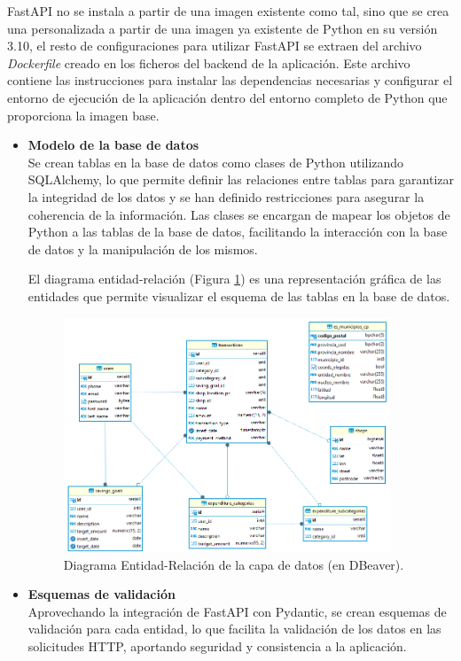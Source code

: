 FastAPI no se instala a partir de una imagen existente como tal, sino que se crea una personalizada a partir de una imagen ya existente de Python en su versión 3.10, el resto de configuraciones para utilizar FastAPI se extraen del archivo \textit{Dockerfile} creado en los ficheros del backend de la aplicación. Este archivo contiene las instrucciones para instalar las dependencias necesarias y configurar el entorno de ejecución de la aplicación dentro del entorno completo de Python que proporciona la imagen base. 

\begin{itemize}
    \item \textbf{Modelo de la base de datos}\\
        Se crean tablas en la base de datos como clases de Python utilizando SQLAlchemy, lo que permite definir las relaciones entre tablas para garantizar la integridad de los datos y se han definido restricciones para asegurar la coherencia de la información. Las clases se encargan de mapear los objetos de Python a las tablas de la base de datos, facilitando la interacción con la base de datos y la manipulación de los mismos.

El diagrama entidad-relación (Figura \ref{fig:diagrama_ER}) es una representación gráfica de las entidades que permite visualizar el esquema de las tablas en la base de datos.

\begin{figure}[ht!]
    \centering
    \includegraphics[height=70mm]{imagenes/diagrama_ER.png}
    \caption{Diagrama Entidad-Relación de la capa de datos (en DBeaver).}
    \label{fig:diagrama_ER}
\end{figure}


    \item \textbf{Esquemas de validación}\\
        Aprovechando la integración de FastAPI con Pydantic, se crean esquemas de validación para cada entidad, lo que facilita la validación de los datos en las solicitudes HTTP, aportando seguridad y consistencia a la aplicación.


\end{itemize}
